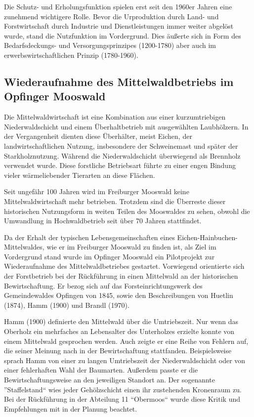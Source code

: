 \documentclass[12pt]{article}
\begin{document}
Die Schutz- und Erholungsfunktion spielen erst seit den 1960er Jahren eine zunehmend wichtigere Rolle.
Bevor die Urproduktion durch Land- und Forstwirtschaft durch Industrie und Dienstleistungen immer weiter
abgelöst wurde, stand die Nutzfunktion im Vordergrund. Dies äußerte sich in Form des Bedarfsdeckungs-
und Versorgungsprinzipes (1200-1780) aber auch im erwerbswirtschaftlichen Prinzip (1780-1960).

\subsection*{Wiederaufnahme des Mittelwaldbetriebs im Opfinger Mooswald}
Die Mittelwaldwirtschaft ist eine Kombination aus einer kurzumtriebigen Niederwaldschicht und einem Überhaltbetrieb
mit ausgewählten Laubhölzern. In der Vergangenheit dienten diese Überhälter, meist Eichen, der landwirtschaftlichen
Nutzung, insbesondere der Schweinemast und später der Starkholznutzung. Während die Niederwaldschicht überwiegend
als Brennholz verwendet wurde. Diese forstliche Betriebsart führte zu einer engen Bindung vieler wärmeliebender 
Tierarten an diese Flächen. 

Seit ungefähr 100 Jahren wird im Freiburger Mooswald keine Mittelwaldwirtschaft mehr betrieben. Trotzdem 
sind die Überreste dieser historischen Nutzungsform in weiten Teilen des Mooswaldes zu sehen, obwohl die
Umwandlung in Hochwaldbetrieb seit über 70 Jahren stattfindet.

Da der Erhalt der typischen Lebensgemeinschaften eines Eichen-Hainbuchen-Mittelwaldes, wie er im Freiburger 
Mooswald zu finden ist, als Ziel im Vordergrund stand wurde im Opfinger Mooswald ein Pilotprojekt
zur Wiederaufnahme des Mittelwaldbetriebes gestartet. Vorwiegend orientierte sich der Forstbetrieb
bei der Rückführung in einen Mittelwald an der historischen Bewirtschaftung. Er bezog sich auf das
Forsteinrichtungswerk des Gemeindewaldes Opfingen von 1845, sowie den Beschreibungen von Huetlin (1874),
Hamm (1900) und Brandl (1970).

Hamm (1900) definierte den Mittelwald über die Umtriebszeit. Nur wenn das Oberholz ein mehrfaches an Lebensalter
des Unterholzes erzielte konnte von einem Mittelwald gesprochen werden. Auch zeigte er eine Reihe von
Fehlern auf, die seiner Meinung nach in der Bewirtschaftung stattfanden. Beispielsweise sprach Hamm von einer
zu langen Umtriebszeit der Niederwaldschicht oder von einer fehlerhaften Wahl der Baumarten. Außerdem
passte er die Bewirtschaftungsweise an den jeweiligen Standort an. Der sogenannte ''Staffelstand`` wies jeder
Gehölzschicht einen ihr zustehenden Kronenraum zu.
Bei der Rückführung in der Abteilung 11 ``Obermoos`` wurde diese Kritik und Empfehlungen mit in der Planung beachtet.
\end{document}
